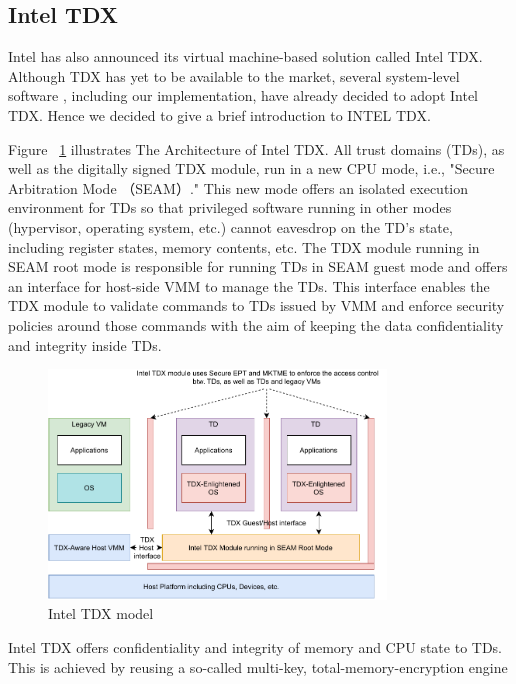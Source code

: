 \subsection{Intel TDX}
\label{subsec:tdx}

Intel has also announced its virtual machine-based solution called Intel TDX\cite*{Intel_tdx_whitepaper}. Although TDX has yet to be available to the market, several system-level software\cite*{Kate_support_tdx} \cite*{Linux_support_tdx}, including our implementation, 
have already decided to adopt Intel TDX. Hence we decided to give a brief introduction to INTEL TDX. 

Figure ~\ref{fig:TDX_diagram} illustrates The Architecture of Intel TDX. All trust domains (TDs), as well as the digitally signed TDX module, run in a new CPU mode, i.e.,  "Secure Arbitration Mode （SEAM）."
This new mode offers an isolated execution environment for TDs so that privileged software running in other modes (hypervisor, operating system, etc.) cannot eavesdrop on the TD's state, including 
register states, memory contents, etc.   The TDX module running in SEAM root mode is responsible for running TDs in SEAM guest mode and offers an interface for host-side VMM to 
manage the TDs. This interface enables the TDX module to validate commands to TDs issued by VMM and enforce security policies around those commands with the aim of keeping the data confidentiality 
and integrity inside TDs. 
\begin{figure}[H]
  \centering
  \includegraphics[width=0.8\textwidth]{images/TDX_diagram.pdf}
  \caption[Intel TDX model]{Intel TDX model}
  \label{fig:TDX_diagram}
\end{figure}
Intel TDX offers confidentiality and integrity of memory and CPU state to TDs. This is achieved by reusing a so-called multi-key, total-memory-encryption engine 
